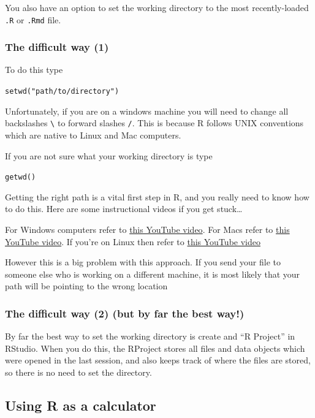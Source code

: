 \documentclass[]{article}
\begin{document}
You also have an option to set the working directory to the most
recently-loaded \texttt{.R} or \texttt{.Rmd} file.

\hypertarget{the-difficult-way-1}{%
\subsubsection{The difficult way (1)}\label{the-difficult-way-1}}

To do this type

\texttt{setwd("path/to/directory")}

Unfortunately, if you are on a windows machine you will need to change
all backslashes \texttt{\textbackslash{}} to forward slashes \texttt{/}.
This is because R follows UNIX conventions which are native to Linux and
Mac computers.

If you are not sure what your working directory is type

\texttt{getwd()}

Getting the right path is a vital first step in R, and you really need
to know how to do this. Here are some instructional videos if you get
stuck\ldots{}

For Windows computers refer to
\href{https://www.youtube.com/watch?v=QzSV8wvA1Do}{this YouTube video}.
For Macs refer to
\href{https://www.youtube.com/watch?v=43W9TuPwqac}{this YouTube video}.
If you're on Linux then refer to
\href{https://www.youtube.com/watch?v=dQw4w9WgXcQ}{this YouTube video}

However this is a big problem with this approach. If you send your file
to someone else who is working on a different machine, it is most likely
that your path will be pointing to the wrong location

\hypertarget{the-difficult-way-2-but-by-far-the-best-way}{%
\subsubsection{The difficult way (2) (but by far the best
way!)}\label{the-difficult-way-2-but-by-far-the-best-way}}

By far the best way to set the working directory is create and ``R
Project'' in RStudio. When you do this, the RProject stores all files
and data objects which were opened in the last session, and also keeps
track of where the files are stored, so there is no need to set the
directory.

\hypertarget{using-r-as-a-calculator}{%
\subsection{Using R as a calculator}\label{using-r-as-a-calculator}}
\end{document}
